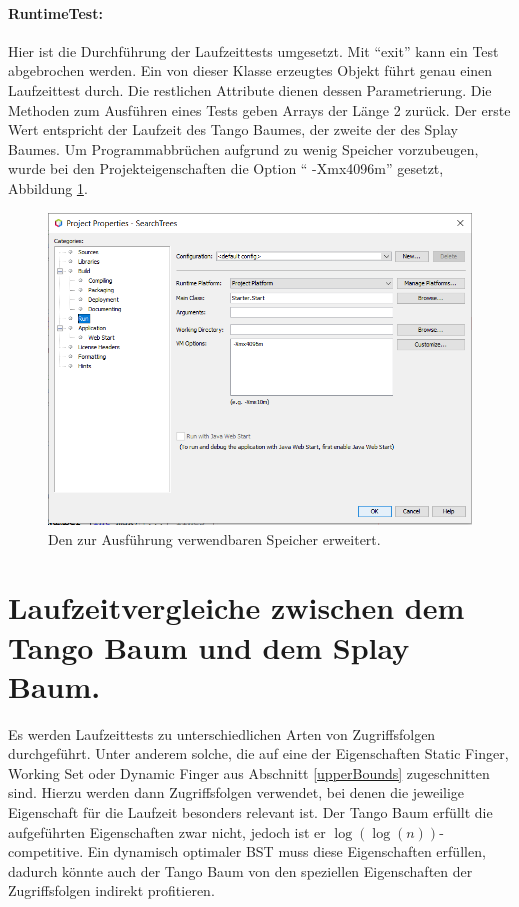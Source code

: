 \documentclass[a4paper,12pt]{article}
\begin{document}
\paragraph{RuntimeTest:}
Hier ist die Durchführung der Laufzeittests umgesetzt. Mit \enquote{exit} kann ein Test abgebrochen werden. Ein von dieser Klasse erzeugtes Objekt führt genau einen Laufzeittest durch. Die restlichen Attribute dienen dessen Parametrierung. Die Methoden zum Ausführen eines Tests  geben Arrays der Länge 2 zurück. Der erste Wert entspricht der Laufzeit des Tango Baumes, der zweite der des Splay Baumes. Um Programmabbrüchen aufgrund zu wenig Speicher vorzubeugen, wurde bei den Projekteigenschaften die Option \enquote{ -Xmx4096m} gesetzt, Abbildung \ref{fig:optionSpeicher}.
\begin{figure}[H]
	\centering
	\includegraphics[width=1\textwidth]{"Medien/laufzeittest/optionSpeicher"}
	\caption{Den zur Ausführung verwendbaren Speicher erweitert.}
	\label{fig:optionSpeicher}
\end{figure}


\section {Laufzeitvergleiche zwischen dem Tango Baum und dem Splay Baum.}

Es werden Laufzeittests zu unterschiedlichen Arten von Zugriffsfolgen durchgeführt. Unter anderem solche, die auf eine der Eigenschaften  Static Finger,  Working Set oder Dynamic Finger aus Abschnitt \ref{upperBounds} zugeschnitten sind. Hierzu werden dann Zugriffsfolgen verwendet, bei denen die jeweilige Eigenschaft für die Laufzeit besonders relevant ist. Der Tango Baum erfüllt die aufgeführten Eigenschaften zwar nicht, jedoch ist er  $\log\left(\log\left(n\right)\right)$-competitive. Ein dynamisch optimaler BST muss diese Eigenschaften erfüllen, dadurch könnte auch der Tango Baum von den speziellen Eigenschaften der Zugriffsfolgen indirekt profitieren.  \\
\end{document}
